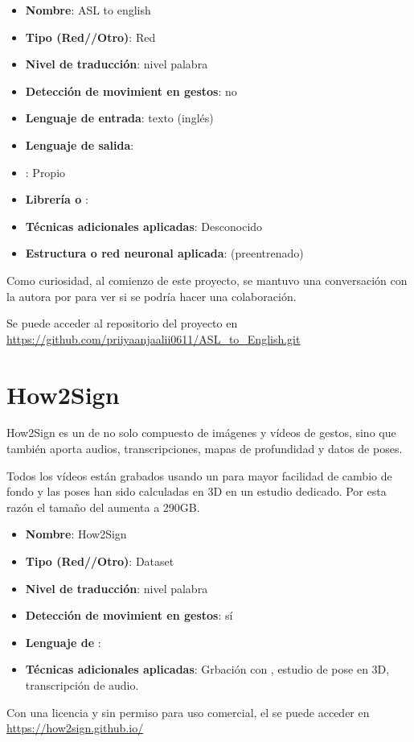 \begin{itemize}
  \item \textbf{Nombre}: ASL to english
  \item \textbf{Tipo (Red//Otro)}: Red
  \item \textbf{Nivel de traducción}: nivel palabra
  \item \textbf{Detección de movimient en gestos}: no
  \item \textbf{Lenguaje de entrada}: texto (inglés)
  \item \textbf{Lenguaje de salida}: 
  \item \textbf{}: Propio
  \item \textbf{Librería o }: 
  \item \textbf{Técnicas adicionales aplicadas}: Desconocido
  \item \textbf{Estructura o red neuronal aplicada}:  (preentrenado)
\end{itemize}

Como curiosidad, al comienzo de este proyecto, se mantuvo una conversación con la autora por  para ver si se podría hacer una colaboración.

Se puede acceder al repositorio del proyecto en \url{https://github.com/priiyaanjaalii0611/ASL_to_English.git}


\section{How2Sign}

How2Sign  es un  de  no solo compuesto de imágenes y vídeos de gestos, sino que también aporta audios, transcripciones, mapas de profundidad y datos de poses.

Todos los vídeos están grabados usando un  para mayor facilidad de cambio de fondo y las poses han sido calculadas en 3D en un estudio dedicado. Por esta razón el tamaño del  aumenta a 290GB.

\begin{itemize}
  \item \textbf{Nombre}: How2Sign
  \item \textbf{Tipo (Red//Otro)}: Dataset
  \item \textbf{Nivel de traducción}: nivel palabra
  \item \textbf{Detección de movimient en gestos}: sí
  \item \textbf{Lenguaje de }: 
  \item \textbf{Técnicas adicionales aplicadas}: Grbación con , estudio de pose en 3D, transcripción de audio.
\end{itemize}

Con una licencia  y sin permiso para uso comercial, el  se puede acceder en \url{https://how2sign.github.io/}